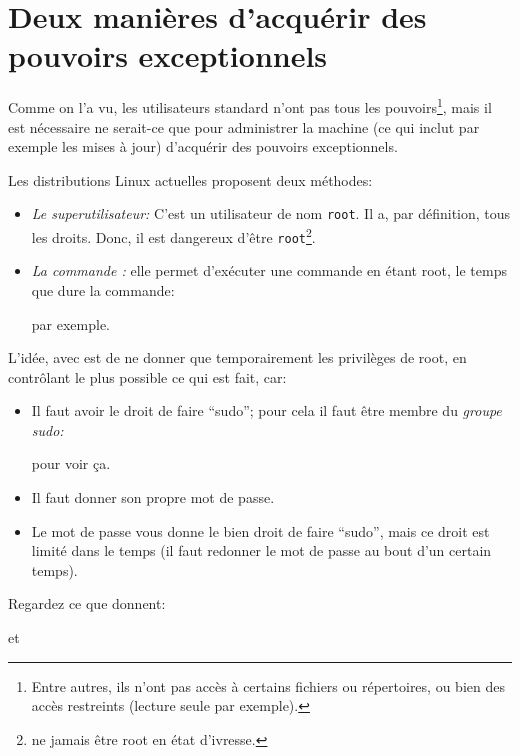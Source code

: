 \section{ Deux manières d'acquérir des pouvoirs exceptionnels}
\textdbend Comme on l'a vu, les utilisateurs \og standard\fg{} n'ont
pas tous les 
pouvoirs\footnote{Entre autres, ils n'ont pas accès à certains
  fichiers ou répertoires, ou bien des accès restreints (lecture seule
  par exemple).}, mais il est nécessaire ne serait-ce que pour administrer la
machine (ce qui inclut par exemple les mises à jour) d'acquérir des
pouvoirs exceptionnels.

Les distributions Linux actuelles proposent deux méthodes:

\begin{itemize}
\item \emph{Le superutilisateur:}
C'est un utilisateur de  nom  \texttt{root}. Il a, par définition, tous les
droits. Donc, il est dangereux d'être \texttt{root}\footnote{ne jamais être
  root en état d'ivresse.}.
\item \emph{La commande :}
  elle permet d'exécuter une commande en étant root, le temps que dure
  la commande: 


  par exemple.
\end{itemize}

L'idée, avec  est de ne donner que temporairement les
privilèges de root, en contrôlant le plus possible ce qui est fait, car:
\begin{itemize}
  \item Il faut avoir le droit de faire ``sudo''; pour cela il faut
    être membre du \emph{groupe sudo:}


    pour voir ça.

  \item Il faut donner son propre mot de passe.

  \item Le mot de passe vous donne le bien droit de faire ``sudo'', mais ce
    droit est limité dans le temps (il faut redonner le mot de passe
    au bout d'un certain temps).
\end{itemize}

Regardez ce que donnent:


et

    

